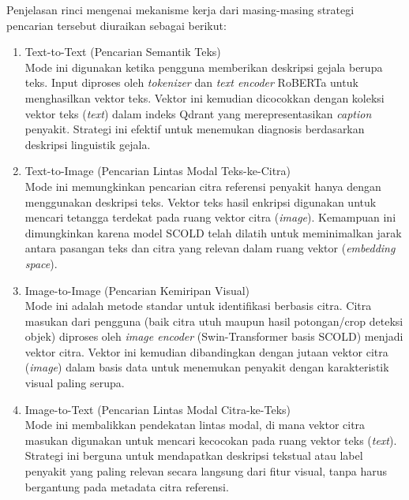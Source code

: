 Penjelasan rinci mengenai mekanisme kerja dari masing-masing strategi pencarian tersebut diuraikan sebagai berikut:

\begin{enumerate}[nosep]
    \item Text-to-Text (Pencarian Semantik Teks) \\
    Mode ini digunakan ketika pengguna memberikan deskripsi gejala berupa teks. Input diproses oleh \textit{tokenizer} dan \textit{text encoder} RoBERTa untuk menghasilkan vektor teks. Vektor ini kemudian dicocokkan dengan koleksi vektor teks (\textit{text}) dalam indeks Qdrant yang merepresentasikan \textit{caption} penyakit. Strategi ini efektif untuk menemukan diagnosis berdasarkan deskripsi linguistik gejala.

    \item Text-to-Image (Pencarian Lintas Modal Teks-ke-Citra) \\
    Mode ini memungkinkan pencarian citra referensi penyakit hanya dengan menggunakan deskripsi teks. Vektor teks hasil enkripsi digunakan untuk mencari tetangga terdekat pada ruang vektor citra (\textit{image}). Kemampuan ini dimungkinkan karena model SCOLD telah dilatih untuk meminimalkan jarak antara pasangan teks dan citra yang relevan dalam ruang vektor (\textit{embedding space}).

    \item Image-to-Image (Pencarian Kemiripan Visual) \\
    Mode ini adalah metode standar untuk identifikasi berbasis citra. Citra masukan dari pengguna (baik citra utuh maupun hasil potongan/crop deteksi objek) diproses oleh \textit{image encoder} (Swin-Transformer basis SCOLD) menjadi vektor citra. Vektor ini kemudian dibandingkan dengan jutaan vektor citra (\textit{image}) dalam basis data untuk menemukan penyakit dengan karakteristik visual paling serupa.

    \item Image-to-Text (Pencarian Lintas Modal Citra-ke-Teks) \\
    Mode ini membalikkan pendekatan lintas modal, di mana vektor citra masukan digunakan untuk mencari kecocokan pada ruang vektor teks (\textit{text}). Strategi ini berguna untuk mendapatkan deskripsi tekstual atau label penyakit yang paling relevan secara langsung dari fitur visual, tanpa harus bergantung pada metadata citra referensi.
\end{enumerate}


